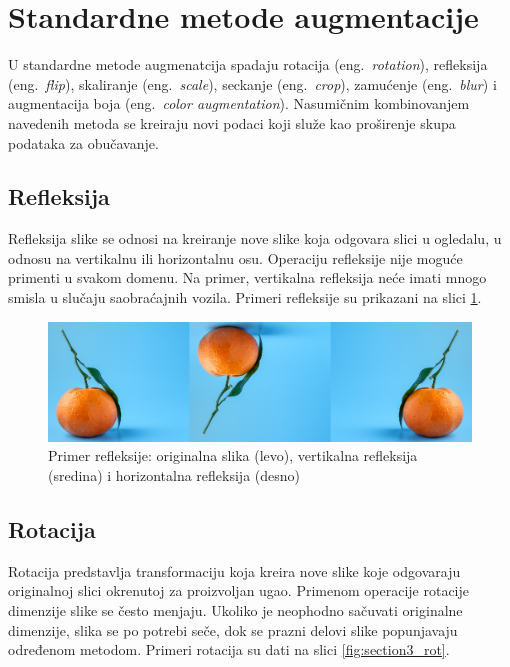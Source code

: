 \documentclass[12pt,oneside]{memoir}
\begin{document}
\section{Standardne metode augmentacije}
\label{section3_increasedata_bas}
U standardne metode augmenatcija spadaju rotacija (eng.~\textit{rotation}), refleksija (eng.~\textit{flip}), skaliranje (eng.~\textit{scale}), seckanje (eng.~\textit{crop}), zamućenje (eng.~\textit{blur}) i augmentacija boja (eng.~\textit{color augmentation}).
Nasumičnim kombinovanjem navedenih metoda se kreiraju novi podaci koji služe kao proširenje skupa podataka za obučavanje.

\subsection{Refleksija}
Refleksija slike se odnosi na kreiranje nove slike koja odgovara slici u ogledalu, u odnosu na vertikalnu ili horizontalnu osu. Operaciju refleksije nije moguće primenti u svakom domenu. Na primer, vertikalna refleksija neće imati mnogo smisla u slučaju saobraćajnih vozila. Primeri refleksije su prikazani na slici \ref{fig:section3_flip}. 

\begin{figure}[ht]
    \centering
    \includegraphics[width=1\textwidth]{matfmaster/glava3/flip.jpg}
    \caption{Primer refleksije: originalna slika (levo), vertikalna refleksija (sredina) i horizontalna refleksija (desno) \cite{unsplashOrange}}
    \label{fig:section3_flip}
\end{figure}

\subsection{Rotacija}
Rotacija predstavlja transformaciju koja kreira nove slike koje odgovaraju originalnoj slici okrenutoj za proizvoljan ugao. Primenom operacije rotacije dimenzije slike se često menjaju. Ukoliko je neophodno sačuvati originalne dimenzije, slika se po potrebi seče, dok se prazni delovi slike popunjavaju određenom metodom. Primeri rotacija su dati na slici \ref{fig:section3_rot}. 
\end{document}
